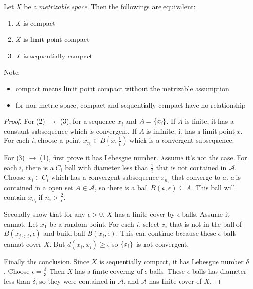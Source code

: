 \begin{theorem}
    Let $X$ be a \emph{metrizable space}. Then the followings are equivalent:
    \begin{enumerate}
        \item $X$ is compact
        \item $X$ is limit point compact
        \item $X$ is sequentially compact
    \end{enumerate}
    
    Note:
    \begin{itemize}
        \item compact means limit point compact without the metrizable assumption
        \item for non-metric space, compact and sequentially compact have no relationship
    \end{itemize}
\end{theorem}
\begin{proof}
    For (2) $\rightarrow$ (3), for a sequence $x_i$ and $A = \set{x_i}$. If $A$ is finite, it has a constant subsequence which is convergent. If $A$ is infinite, it has a limit point $x$. For each $i$, choose a point $x_{n_i} \in B(x, \frac{1}{i})$ which is a convergent subsequence.
    
    For (3) $\rightarrow$ (1), first prove it has Lebesgue number. Assume it's not the case. For each $i$, there is a $C_i$ ball with diameter less than $\frac{1}{i}$ that is not contained in $\mathcal{A}$. Choose $x_i \in C_i$ which has a convergent subsequence $x_{n_i}$ that converge to $a$. $a$ is contained in a open set $A \in \mathcal{A}$, so there is a ball $B(a, \epsilon) \subseteq A$. This ball will contain $x_{n_i}$ if $n_i > \frac{2}{\epsilon}$.
    
    Secondly show that for any $\epsilon > 0$, $X$ has a finite cover by $\epsilon$-balls. Assume it cannot. Let $x_1$ be a random point. For each $i$, select $x_i$ that is not in the ball of $B(x_{j < i}, \epsilon)$ and build ball $B(x_i, \epsilon)$. This can continue because these $\epsilon$-balls cannot cover $X$. But $d(x_i, x_j) \geq \epsilon$ so $\set{x_i}$ is not convergent.
    
    Finally the conclusion. Since $X$ is sequentially compact, it has Lebesgue number $\delta$. Choose $\epsilon = \frac{\delta}{3}$ Then $X$ has a finite covering of $\epsilon$-balls. These $\epsilon$-balls has diameter less than $\delta$, so they were contained in $\mathcal{A}$, and $\mathcal{A}$ has finite cover of $X$.
\end{proof}


